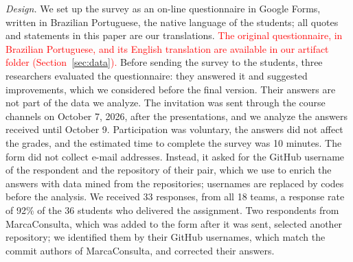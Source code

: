 \documentclass[conference]{IEEEtran}
\begin{document}
\emph{Design.} We set up the survey as an on-line questionnaire in Google Forms, written in Brazilian Portuguese, the native language of the students; all quotes and statements in this paper are our translations. \textcolor{red}{The original questionnaire, in Brazilian Portuguese, and its English translation are available in our artifact folder (Section~\ref{sec:data}).} Before sending the survey to the students, three researchers evaluated the questionnaire: they answered it and suggested improvements, which we considered before the final version. Their answers are not part of the data we analyze. The invitation was sent through the course channels on October 7, 2026, after the presentations, and we analyze the answers received until October 9. Participation was voluntary, the answers did not affect the grades, and the estimated time to complete the survey was 10 minutes. The form did not collect e-mail addresses. Instead, it asked for the GitHub username of the respondent and the repository of their pair, which we use to enrich the answers with data mined from the repositories; usernames are replaced by codes before the analysis. We received 33 responses, from all 18 teams, a response rate of 92\% of the 36 students who delivered the assignment. Two respondents from MarcaConsulta, which was added to the form after it was sent, selected another repository; we identified them by their GitHub usernames, which match the commit authors of MarcaConsulta, and corrected their answers.
\end{document}
